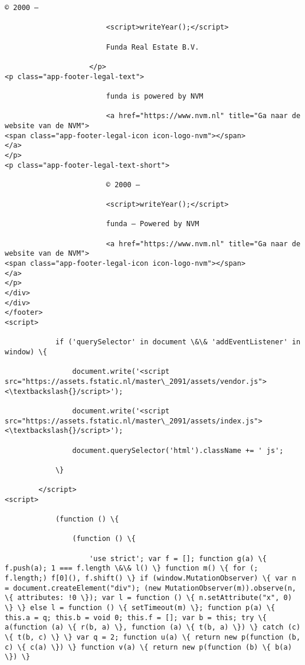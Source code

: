 \documentclass[11pt]{article}
\begin{document}
\begin{Verbatim}[commandchars=\\\{\}]
                        © 2000 –

                        <script>writeYear();</script>

                        Funda Real Estate B.V.

                    </p>
<p class="app-footer-legal-text">

                        funda is powered by NVM

                        <a href="https://www.nvm.nl" title="Ga naar de website van de NVM">
<span class="app-footer-legal-icon icon-logo-nvm"></span>
</a>
</p>
<p class="app-footer-legal-text-short">

                        © 2000 –

                        <script>writeYear();</script>

                        funda — Powered by NVM

                        <a href="https://www.nvm.nl" title="Ga naar de website van de NVM">
<span class="app-footer-legal-icon icon-logo-nvm"></span>
</a>
</p>
</div>
</div>
</footer>
<script>

            if ('querySelector' in document \&\& 'addEventListener' in window) \{

                document.write('<script src="https://assets.fstatic.nl/master\_2091/assets/vendor.js"><\textbackslash{}/script>');

                document.write('<script src="https://assets.fstatic.nl/master\_2091/assets/index.js"><\textbackslash{}/script>');

                document.querySelector('html').className += ' js';

            \}

        </script>
<script>

            (function () \{

                (function () \{

                    'use strict'; var f = []; function g(a) \{ f.push(a); 1 === f.length \&\& l() \} function m() \{ for (; f.length;) f[0](), f.shift() \} if (window.MutationObserver) \{ var n = document.createElement("div"); (new MutationObserver(m)).observe(n, \{ attributes: !0 \}); var l = function () \{ n.setAttribute("x", 0) \} \} else l = function () \{ setTimeout(m) \}; function p(a) \{ this.a = q; this.b = void 0; this.f = []; var b = this; try \{ a(function (a) \{ r(b, a) \}, function (a) \{ t(b, a) \}) \} catch (c) \{ t(b, c) \} \} var q = 2; function u(a) \{ return new p(function (b, c) \{ c(a) \}) \} function v(a) \{ return new p(function (b) \{ b(a) \}) \}


\end{Verbatim}
\end{document}
